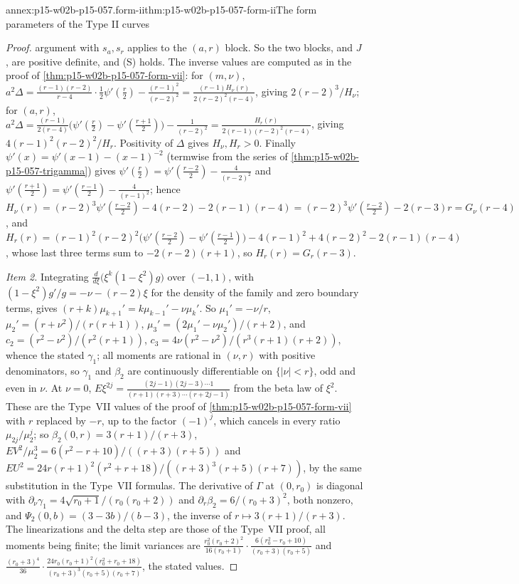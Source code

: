 \begin{annexitem}{annex:p15-w02b-p15-057.form-ii}{thm:p15-w02b-p15-057-form-ii}{The form parameters of the Type II curves}
\begin{proof}
argument with \(s_a,s_r\) applies to the \((a,r)\) block. So
the two blocks, and \(J\), are positive definite, and (S) holds. The
inverse values are computed as in the proof of
\cref{thm:p15-w02b-p15-057-form-vii}: for \((m,\nu)\),
\(a^2\Delta=\frac{(r-1)(r-2)}{r-4}\cdot\frac12\psi'(\frac r2)
-\frac{(r-1)^2}{(r-2)^2}=\frac{(r-1)H_\nu(r)}{2(r-2)^2(r-4)}\), giving
\(2(r-2)^3/H_\nu\); for \((a,r)\),
\(a^2\Delta=\frac{(r-1)}{2(r-4)}\bigl(\psi'(\frac r2)-\psi'(\frac{r+1}2)\bigr)
-\frac1{(r-2)^2}=\frac{H_r(r)}{2(r-1)(r-2)^2(r-4)}\), giving
\(4(r-1)^2(r-2)^2/H_r\). Positivity of \(\Delta\) gives \(H_\nu,H_r>0\).
Finally \(\psi'(x)=\psi'(x-1)-(x-1)^{-2}\) (termwise from the series of
\cref{thm:p15-w02b-p15-057-trigamma}) gives
\(\psi'(\frac r2)=\psi'(\frac{r-2}2)-\frac4{(r-2)^2}\) and
\(\psi'(\frac{r+1}2)=\psi'(\frac{r-1}2)-\frac4{(r-1)^2}\); hence
\(H_\nu(r)=(r-2)^3\psi'(\frac{r-2}2)-4(r-2)-2(r-1)(r-4)
=(r-2)^3\psi'(\frac{r-2}2)-2(r-3)r=G_\nu(r-4)\), and
\(H_r(r)=(r-1)^2(r-2)^2\bigl(\psi'(\frac{r-2}2)-\psi'(\frac{r-1}2)\bigr)
-4(r-1)^2+4(r-2)^2-2(r-1)(r-4)\), whose last three terms sum to
\(-2(r-2)(r+1)\), so \(H_r(r)=G_r(r-3)\).

\emph{Item 2.} Integrating
\(\frac d{d\xi}\bigl(\xi^k(1-\xi^2)g\bigr)\) over \((-1,1)\), with
\((1-\xi^2)g'/g=-\nu-(r-2)\xi\) for the density of the family and zero
boundary terms, gives \((r+k)\mu_{k+1}'=k\mu_{k-1}'-\nu\mu_k'\). So
\(\mu_1'=-\nu/r\), \(\mu_2'=(r+\nu^2)/(r(r+1))\),
\(\mu_3'=(2\mu_1'-\nu\mu_2')/(r+2)\), and
\(c_2=(r^2-\nu^2)/(r^2(r+1))\), \(c_3=4\nu(r^2-\nu^2)/(r^3(r+1)(r+2))\),
whence the stated \(\gamma_1\); all moments are rational in \((\nu,r)\)
with positive denominators, so \(\gamma_1\) and \(\beta_2\) are
continuously differentiable on \(\{|\nu|<r\}\), odd and even in \(\nu\).
At \(\nu=0\), \(E\xi^{2j}=\frac{(2j-1)(2j-3)\cdots1}{(r+1)(r+3)\cdots(r+2j-1)}\)
from the beta law of \(\xi^2\). These are the Type~VII values of the
proof of \cref{thm:p15-w02b-p15-057-form-vii} with \(r\) replaced by
\(-r\), up to the factor \((-1)^j\), which cancels in every ratio
\(\mu_{2j}/\mu_2^j\); so \(\beta_2(0,r)=3(r+1)/(r+3)\),
\(EV^2/\mu_2^3=6(r^2-r+10)/((r+3)(r+5))\) and
\(EU^2=24r(r+1)^2(r^2+r+18)/((r+3)^3(r+5)(r+7))\), by the same
substitution in the Type~VII formulas. The derivative of \(\Gamma\) at
\((0,r_0)\) is diagonal with \(\partial_\nu\gamma_1
=4\sqrt{r_0+1}/(r_0(r_0+2))\) and \(\partial_r\beta_2=6/(r_0+3)^2\), both
nonzero, and \(\Psi_2(0,b)=(3-3b)/(b-3)\), the inverse of
\(r\mapsto3(r+1)/(r+3)\). The linearizations and the delta step are
those of the Type~VII proof, all moments being finite; the limit
variances are \(\frac{r_0^2(r_0+2)^2}{16(r_0+1)}\cdot
\frac{6(r_0^2-r_0+10)}{(r_0+3)(r_0+5)}\) and
\(\frac{(r_0+3)^4}{36}\cdot\frac{24r_0(r_0+1)^2(r_0^2+r_0+18)}
{(r_0+3)^3(r_0+5)(r_0+7)}\), the stated values.


\end{proof}
\end{annexitem}
